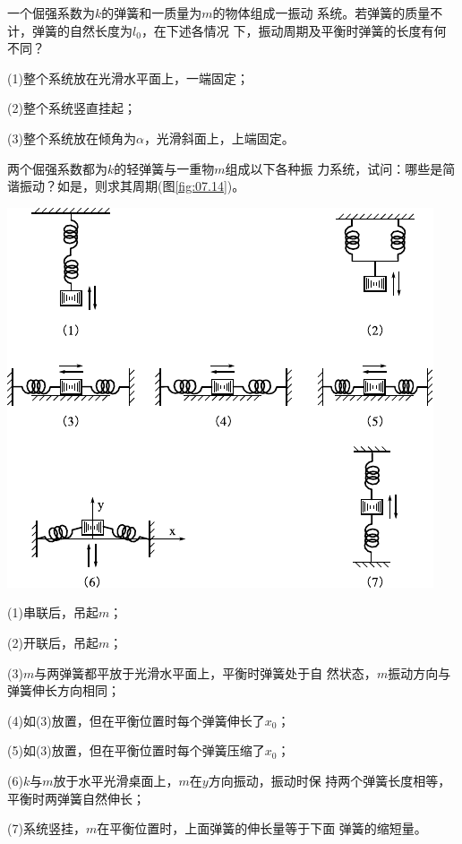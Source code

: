 \begin{questions}
  \question 一个倔强系数为$ k $的弹簧和一质量为$ m $的物体组成一振动
  系统。若弹簧的质量不计，弹簧的自然长度为$ l _ { 0 } $，在下述各情况
  下，振动周期及平衡时弹簧的长度有何不同？

  (1)整个系统放在光滑水平面上，一端固定；

  (2)整个系统竖直挂起；

  (3)整个系统放在倾角为$ \alpha $，光滑斜面上，上端固定。

  \question 两个倔强系数都为$ k $的轻弹簧与一重物$ m $组成以下各种振
  力系统，试问：哪些是简谐振动？如是，则求其周期(图\ref{fig:07.14})。
  \begin{figurex}
    \centering
    \includegraphics{figure/fig07.14}
    \caption{}
    \label{fig:07.14}
  \end{figurex}

  \clearpage
  (1)串联后，吊起$ m $；

  (2)开联后，吊起$ m $；

  (3)\;$ m $与两弹簧都平放于光滑水平面上，平衡时弹簧处于自
  然状态，$ m $振动方向与弹簧伸长方向相同；

  (4)如(3)放置，但在平衡位置时每个弹簧伸长了$ x _ 0 $；

  (5)如(3)放置，但在平衡位置时每个弹簧压缩了$ x _ 0 $；

  (6)\;$ k $与$ m $放于水平光滑桌面上，$ m $在$ y $方向振动，振动时保
  持两个弹簧长度相等，平衡时两弹簧自然伸长；

  (7)系统竖挂，$ m $在平衡位置时，上面弹簧的伸长量等于下面
  弹簧的缩短量。


\end{questions}
